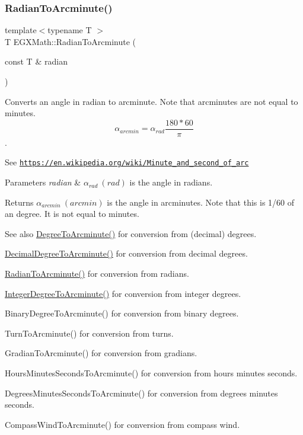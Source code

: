 \subsubsection{\texorpdfstring{Radian\+To\+Arcminute()}{RadianToArcminute()}}
{\footnotesize\ttfamily template$<$typename T $>$ \\
T E\+G\+X\+Math\+::\+Radian\+To\+Arcminute (\begin{DoxyParamCaption}\item[{const T \&}]{radian }\end{DoxyParamCaption})}



Converts an angle in radian to arcminute. Note that arcminutes are not equal to minutes. \[\alpha_{arcmin}=\alpha_{rad}\frac{180 * 60}{\pi}\]. 

See \href{https://en.wikipedia.org/wiki/Minute_and_second_of_arc}{\tt https\+://en.\+wikipedia.\+org/wiki/\+Minute\+\_\+and\+\_\+second\+\_\+of\+\_\+arc} 
\begin{DoxyParams}{Parameters}
{\em radian} & $\alpha_{rad}\ (rad)$ is the angle in radians. \\
\hline
\end{DoxyParams}
\begin{DoxyReturn}{Returns}
$\alpha_{arcmin}\ (arcmin)$ is the angle in arcminutes. Note that this is 1/60 of an degree. It is not equal to minutes. 
\end{DoxyReturn}
\begin{DoxySeeAlso}{See also}
\mbox{\hyperlink{group___e_g_x_math-_angle_conversions-_degree_ga8abf327dc5f52907b2c881999e9cc43e}{Degree\+To\+Arcminute()}} for conversion from (decimal) degrees. 

\mbox{\hyperlink{group___e_g_x_math-_angle_conversions-_decimal_degree_ga6b6ea6e45d2a13f556824ca419cc9fbd}{Decimal\+Degree\+To\+Arcminute()}} for conversion from decimal degrees. 

\mbox{\hyperlink{group___e_g_x_math-_angle_conversions-_radian_ga722e3b8e78540a6b3942b73b64aeb8d2}{Radian\+To\+Arcminute()}} for conversion from radians. 

\mbox{\hyperlink{group___e_g_x_math-_angle_conversions-_integer_degree_ga78b014e7649d666a3647c467e64e4fe8}{Integer\+Degree\+To\+Arcminute()}} for conversion from integer degrees. 

Binary\+Degree\+To\+Arcminute() for conversion from binary degrees. 

Turn\+To\+Arcminute() for conversion from turns. 

Gradian\+To\+Arcminute() for conversion from gradians. 

Hours\+Minutes\+Seconds\+To\+Arcminute() for conversion from hours minutes seconds. 

Degrees\+Minutes\+Seconds\+To\+Arcminute() for conversion from degrees minutes seconds. 

Compass\+Wind\+To\+Arcminute() for conversion from compass wind. 
\end{DoxySeeAlso}
